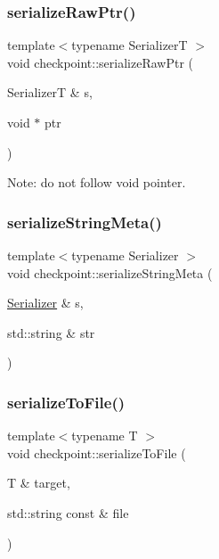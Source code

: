 \mbox{\label{namespacecheckpoint_aaadeb0ab61d069afc8a97ec6b6dc630c}} 
\subsubsection{\texorpdfstring{serialize\+Raw\+Ptr()}{serializeRawPtr()}\hspace{0.1cm}{\footnotesize\ttfamily [2/2]}}
{\footnotesize\ttfamily template$<$typename SerializerT $>$ \\
void checkpoint\+::serialize\+Raw\+Ptr (\begin{DoxyParamCaption}\item[{SerializerT \&}]{s,  }\item[{void $\ast$}]{ptr }\end{DoxyParamCaption})}

Note\+: do not follow void pointer. \mbox{\label{namespacecheckpoint_a1ea8e1ef9d0a10d26df77cb5309435aa}} 
\subsubsection{\texorpdfstring{serialize\+String\+Meta()}{serializeStringMeta()}}
{\footnotesize\ttfamily template$<$typename Serializer $>$ \\
void checkpoint\+::serialize\+String\+Meta (\begin{DoxyParamCaption}\item[{\hyperlink{structcheckpoint_1_1_serializer}{Serializer} \&}]{s,  }\item[{std\+::string \&}]{str }\end{DoxyParamCaption})}

\mbox{\label{namespacecheckpoint_a3d4326982e3c3feeb933e985758eea82}} 
\subsubsection{\texorpdfstring{serialize\+To\+File()}{serializeToFile()}}
{\footnotesize\ttfamily template$<$typename T $>$ \\
void checkpoint\+::serialize\+To\+File (\begin{DoxyParamCaption}\item[{T \&}]{target,  }\item[{std\+::string const \&}]{file }\end{DoxyParamCaption})}



